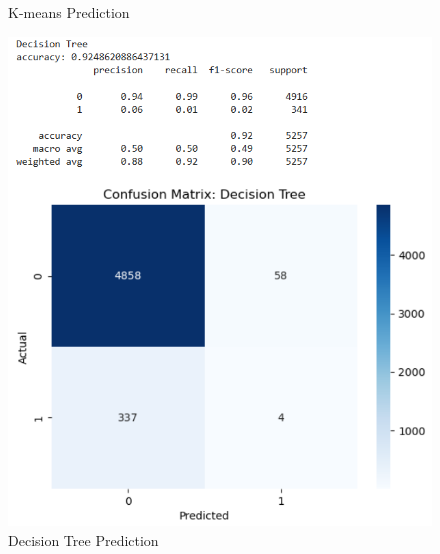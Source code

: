 \documentclass{article}
\begin{document}
\begin{figure}[h!]
\begin{minipage}{0.32\textwidth}
		\caption{K-means Prediction}
		\label{fig:P9}
	\end{minipage}\hfill
	\begin{minipage}{0.32\textwidth}
		\centering
		\includegraphics[width=0.9\linewidth]{../Image/P10.jpg}
		\caption{Decision Tree Prediction}
		\label{fig:P10}
	\end{minipage}
	
	\vspace{0.5cm} %
	

\end{figure}
\end{document}
